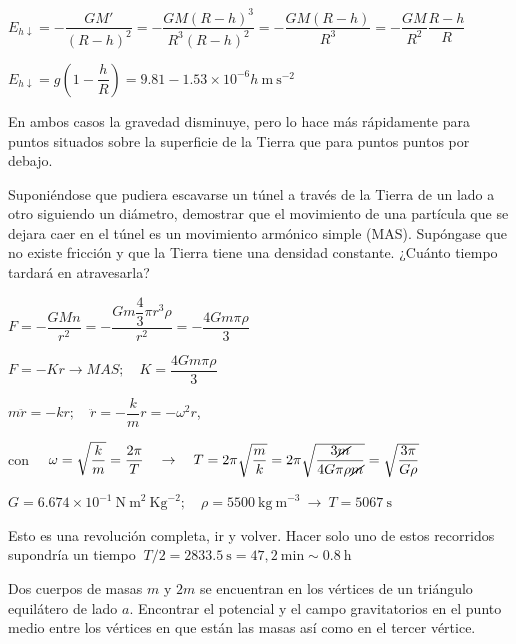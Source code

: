 $E_{h\downarrow}=-\dfrac{GM'}{(R-h)^2}=-\dfrac{GM(R-h)^3}{R^3(R-h)^2}=-\dfrac{GM(R-h)}{R^3}=-\dfrac{GM}{R^2} \dfrac{R-h}{R}$

$E_{h\downarrow}=g\left( 1-\dfrac h R \right) =9.81-1.53\times 10^{-6}h\ \mathrm{m\ s}^{-2}$

En ambos casos la gravedad disminuye, pero lo hace más rápidamente para puntos situados sobre la superficie de la Tierra que para puntos puntos por debajo.




\begin{prob}
 Suponiéndose que pudiera escavarse un túnel a través de la Tierra de un lado a otro siguiendo un diámetro, demostrar que el movimiento de una partícula que se dejara caer en el túnel es un movimiento armónico simple (MAS). Supóngase que no existe fricción y que la Tierra tiene una densidad constante. ¿Cuánto tiempo tardará en atravesarla?
\end{prob}

$F=-\dfrac{GMn}{r^2}=-\dfrac{Gm\dfrac 4 3 \pi r^3 \rho}{r^2}=-\dfrac{4Gm\pi \rho}{3}$

$F=-Kr \to MAS;\quad K=\dfrac{4Gm\pi \rho}{3}$

$m \ddot{r}=-kr;\quad \ddot{r}=-\dfrac k m r=-\omega^2 r$, 

con $\quad \omega=\sqrt{\dfrac k m}=\dfrac{2\pi}{T} \quad \to \quad T=2\pi\sqrt{\dfrac m k}=2\pi \sqrt{\dfrac{3 \cancel{m}}{4G\pi \rho \cancel{m}}}=\sqrt{\dfrac{3 \pi}{G \rho}}$
 
$G=6.674\times 10^{-1} \ \mathrm{N\ m}^2 \ \mathrm{Kg}^{-2}; \quad \rho=5500 \ \mathrm{kg\ m}^{-3} \ \to \ T=5067\ \mathrm{s}$

Esto es una revolución completa, ir y volver. Hacer solo uno de estos recorridos supondría un tiempo $\ T/2=2833.5\ \mathrm{s} =47,2\ \mathrm{min}\sim 0.8 \ \mathrm{h}$

\vspace{10mm} %
\begin{prob}
	Dos cuerpos de masas $m$ y $2m$ se encuentran en los vértices de un triángulo equilátero de lado $a$. Encontrar el potencial y el campo gravitatorios en el punto medio entre los vértices en que están las masas así como en el tercer vértice.
\end{prob}

